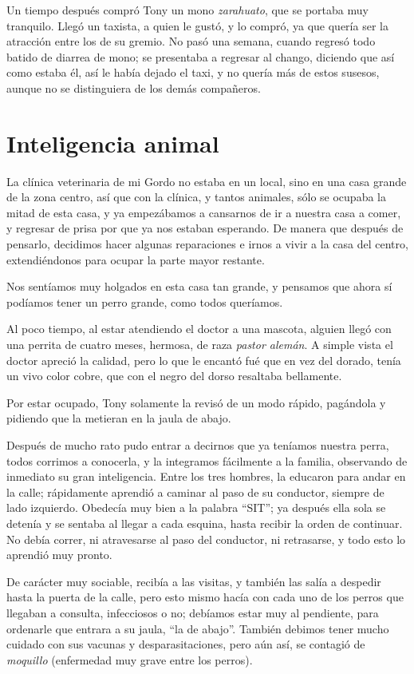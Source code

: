 \documentclass[letterpaper, 12pt]{book}
\begin{document}
Un tiempo después compró Tony un mono \textit{zarahuato}, que se portaba muy tranquilo. Llegó un taxista, a quien le gustó, y lo compró, ya que quería ser la atracción entre los de su gremio. No pasó una semana, cuando regresó todo batido de diarrea de mono; se presentaba a  regresar al chango, diciendo que así como estaba él, así le había dejado el taxi, y no quería más de estos susesos, aunque no se distinguiera de los demás compañeros.
\chapter{Inteligencia animal}
La clínica veterinaria de mi Gordo no estaba en un local, sino en una casa grande de la zona centro, así que con la clínica, y tantos animales, sólo se ocupaba la mitad de esta casa, y ya empezábamos a cansarnos de ir a nuestra casa a comer, y regresar de prisa por que ya nos estaban esperando.
De manera que después de pensarlo, decidimos hacer algunas reparaciones e irnos a vivir a la casa del centro, extendiéndonos para ocupar la parte mayor restante.

Nos sentíamos muy holgados en esta casa tan grande, y pensamos  que ahora sí podíamos tener un perro grande, como todos queríamos.

Al poco tiempo, al estar atendiendo el doctor a una mascota, alguien llegó con una perrita de cuatro meses, hermosa, de raza \textit{pastor alemán}. A simple vista el doctor apreció la calidad, pero lo que le encantó fué que en vez del dorado, tenía un vivo color cobre, que con el negro del dorso resaltaba bellamente.

Por estar ocupado, Tony solamente la revisó de un modo rápido, pagándola y pidiendo que la metieran en la jaula de abajo.

Después de mucho rato pudo entrar a decirnos que ya teníamos nuestra perra, todos corrimos a conocerla, y la integramos fácilmente a la familia, observando de inmediato su gran inteligencia. Entre los tres hombres, la educaron para andar en la calle; rápidamente aprendió a caminar al paso de su conductor, siempre de lado izquierdo. Obedecía muy bien a la palabra ``SIT''; ya después ella sola se detenía y se sentaba al llegar a cada esquina, hasta recibir la orden de continuar. No debía correr, ni atravesarse al paso del conductor, ni retrasarse, y todo esto lo aprendió muy pronto. 

De carácter muy sociable, recibía a las visitas, y también las salía a despedir hasta la puerta de la calle, pero esto mismo hacía con cada uno de los perros que llegaban a consulta, infecciosos o no; debíamos estar muy al pendiente, para ordenarle que entrara a su jaula, ``la de abajo''. También debimos tener mucho cuidado con sus vacunas y desparasitaciones, pero aún así, se contagió de \textit{moquillo} (enfermedad muy grave entre los perros).
\end{document}
